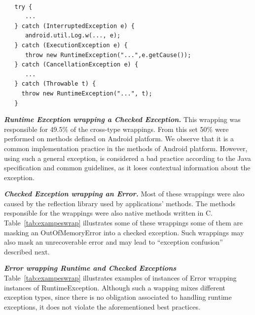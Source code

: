 

{\footnotesize
\begin{verbatim}
  
   try {
      ...
   } catch (InterruptedException e) {
      android.util.Log.w(..., e);
   } catch (ExecutionException e) {
      throw new RuntimeException("...",e.getCause());
   } catch (CancellationException e) {
      ...
   } catch (Throwable t) {
     throw new RuntimeException("...", t);
   }
\end{verbatim}
}

\emph{\textbf{Runtime Exception wrapping a Checked Exception.}} 
This wrapping was responsible for 49.5\% of
the cross-type wrappings.  From this set 50\%  were performed on methods defined on Android platform. 
We observe that it is a common implementation practice in the methods of Android platform.
However, using such a general exception, is considered a bad practice
according to the Java specification and common guidelines, as it loses contextual information about the exception.

\bigskip


\bigskip

\emph{\textbf{Checked Exception wrapping an Error.}} Most of these wrappings
 were also caused by the reflection library used by applications' methods. The methods responsible for the wrappings
were also native methods written in C. Table~\ref{tab:exampeswrap} illustrates
some of these wrappings some of them are masking an OutOfMemoryError
into a checked exception. Such wrappings may also mask an unrecoverable error
and may lead to ``exception confusion'' described next.

\emph{\textbf{Error wrapping Runtime and Checked Exceptions}} Table~\ref{tab:exampeswrap}  illustrates
examples of instances of Error wrapping instances of
RuntimeException. 
Although such a wapping mixes different exception types,
since there is no obligation associated to handling runtime exceptions, it
does not violate the aforementioned best practices. 

